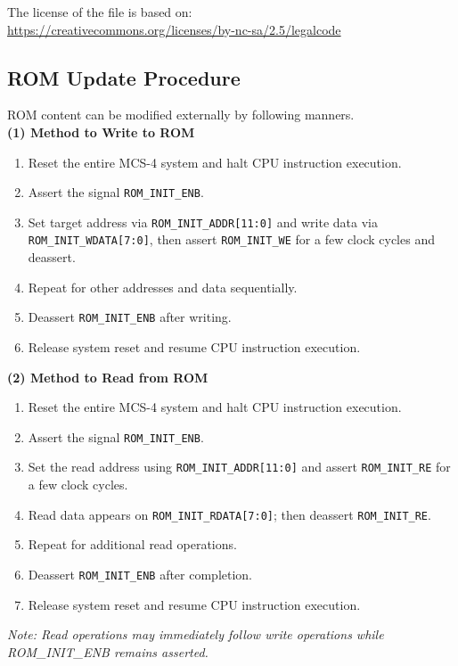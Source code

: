 The license of the file is based on: \\
\url{https://creativecommons.org/licenses/by-nc-sa/2.5/legalcode}


\subsection{\textbf{ROM Update Procedure}}
ROM content can be modified externally by following manners. \\

\textbf{(1) Method to Write to ROM}\\
\begin{enumerate}
  \item Reset the entire MCS-4 system and halt CPU instruction execution.
  \item Assert the signal \verb|ROM_INIT_ENB|.
  \item Set target address via \verb|ROM_INIT_ADDR[11:0]| and write data via \verb|ROM_INIT_WDATA[7:0]|, then assert \verb|ROM_INIT_WE| for a few clock cycles and deassert.
  \item Repeat for other addresses and data sequentially.
  \item Deassert \verb|ROM_INIT_ENB| after writing.
  \item Release system reset and resume CPU instruction execution.
\end{enumerate}

\textbf{(2) Method to Read from ROM}\\
\begin{enumerate}
  \item Reset the entire MCS-4 system and halt CPU instruction execution.
  \item Assert the signal \verb|ROM_INIT_ENB|.
  \item Set the read address using \verb|ROM_INIT_ADDR[11:0]| and assert \verb|ROM_INIT_RE| for a few clock cycles.
  \item Read data appears on \verb|ROM_INIT_RDATA[7:0]|; then deassert \verb|ROM_INIT_RE|.
  \item Repeat for additional read operations.
  \item Deassert \verb|ROM_INIT_ENB| after completion.
  \item Release system reset and resume CPU instruction execution.
\end{enumerate}

\textit{Note: Read operations may immediately follow write operations while ROM\_INIT\_ENB remains asserted.}


